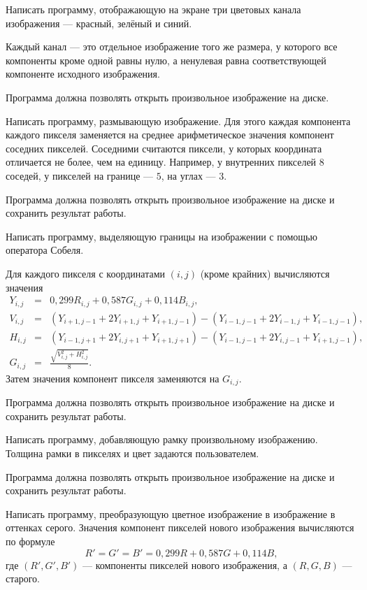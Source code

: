 \task Написать программу, отображающую на экране три цветовых канала
изображения — красный, зелёный и синий.

Каждый канал — это отдельное изображение того же размера, у которого
все компоненты кроме одной равны нулю, а ненулевая равна
соответствующей компоненте исходного изображения.

Программа должна позволять открыть произвольное изображение на диске.

\task Написать программу, размывающую изображение.  Для этого каждая
компонента каждого пикселя заменяется на среднее арифметическое
значения компонент соседних пикселей. Соседними считаются пиксели, у
которых координата отличается не более, чем на единицу. Например, у
внутренних пикселей $8$ соседей, у пикселей на границе — $5$, на углах
— $3$.

Программа должна позволять открыть произвольное изображение на диске и
сохранить результат работы.

\task Написать программу, выделяющую границы на изображении с помощью
оператора Собеля.

Для каждого пикселя с координатами $(i,j)$ (кроме крайних) вычисляются
значения
\begin{eqnarray*}
Y_{i,j} &=& 0{,}299 R_{i,j} + 0{,}587 G_{i,j} + 0{,}114 B_{i,j},\\
V_{i,j} &=& (Y_{i+1,j-1} + 2 Y_{i+1,j} + Y_{i+1,j-1}) - (Y_{i-1,j-1} + 2 Y_{i-1,j} + Y_{i-1,j-1}),\\
H_{i,j} &=& (Y_{i-1,j+1} + 2 Y_{i,j+1} + Y_{i+1,j+1}) - (Y_{i-1,j-1} + 2 Y_{i,j-1} + Y_{i+1,j-1}),\\
G_{i,j} &=& \frac{\sqrt{V_{i,j}^2+H_{i,j}^2}}{8}.
\end{eqnarray*}
Затем значения компонент пикселя заменяются на $G_{i,j}.$

Программа должна позволять открыть произвольное изображение на диске и
сохранить результат работы.

\task Написать программу, добавляющую рамку произвольному
изображению. Толщина рамки в пикселях и цвет задаются пользователем.

Программа должна позволять открыть произвольное изображение на диске и
сохранить результат работы.

\task Написать программу, преобразующую цветное изображение в
изображение в оттенках серого. Значения компонент пикселей нового
изображения вычисляются по формуле
\[
R' = G' = B' = 0{,}299 R + 0{,}587 G + 0{,}114 B,
\]
где $(R',G',B')$ — компоненты пикселей нового изображения, а $(R,G,B)$
— старого.

